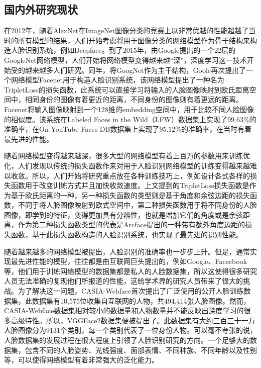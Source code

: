 
\subsection{国内外研究现状}

在2012年，随着AlexNet\cite{alexnet}在ImageNet图像分类的竞赛上以非常优越的性能超越了当时的所有模型的结果，人们开始考虑将用于图像分类的网络模型作为骨干结构来构造人脸识别系统，例如Deepface\cite{deepface}。到了2015年，由Google提出的一个22层的GoogleNet\cite{googlenet}网络模型，人们开始将网络模型变得越来越“深”，深度学习这一技术开始受的越来越多人们研究。同年，将GoogNet作为主干结构，Goole再次提出了一个网络模型Facenet\cite{facenet}用于构造人脸识别系统，该网络模型提出了一种名为TripletLoss的损失函数，此系统可以直接学习将输入的人脸图像映射到欧氏距离空间中，相同身份的图像有着更近的距离，不同身份的图像则有着更远的距离。Facenet将输入图像映射到一个128维的embedding空间中，用于比较不同人脸图像的相似度。该系统在Labeled Faces in the Wild（LFW）数据集上实现了$99.63\%$的准确率，在On YouTube Faces DB数据集上实现了$95.12\%$的准确率，在当时有着最先进的性能。

随着网络模型变得越来越深，很多大型的网络模型有着上百万的参数用来训练优化，人们发现以传统的损失函数作来对用于人脸识别网络模型的训练变得越来越难以收敛。所以，人们开始将研究重点放在各种训练技巧上，例如设计各式各样的损失函数用于改变训练方式并且加快收敛速度。上文提到的TripletLoss损失函数是作为基于欧氏距离的一种，另一种损失函数的类型则是基于角度和余弦边距的损失函数，不同于将人脸图像映射到欧式空间中，第二种损失函数用于将不同身份的人脸图像，即学到的特征，变得更加具有分辨性，也就是增加它们的角度或是余弦距离，作为第二种损失函数类型的代表是Arcface\cite{arcface}提出的一种带有额外角度边距的损失函数，基于此损失函数构造的人脸识别系统，也实现了最先进的识别性能。

随着越来越多的网络模型被提出，人脸识别的准确率也一步步上升。但是，通常实现最先进性能的模型，往往都是由互联网巨头提出的，例如Google、Facecbook等，他们用于训练网络模型的数据集都是私人的人脸数据集，所以这使得很多研究人员无法准确的复现他们所报道的性能，这给学术界的研究人员带来了很大的挑战。为了解决这一问题，CASIA-Webface\cite{webface}首次提出了广泛使用的公开人脸训练数据集，此数据集有10,575位收集自互联网的人物，共494,414张人脸图像。然而，CASIA-Webface数据集相对较小的数据量和人物数量并不能反映出深度学习的很多高级特性。所以，VGGFace2\cite{vggface2}数据集便被提出了。此数据集有大约三百三十一万人脸图像分为9131个类别，每一个类别代表了一位身份人物。可以毫不夸张的说，人脸数据集的发展过程在很大程度上引领了人脸识别研究的方向。一个足够大的数据集，包含不同的人脸姿势、光线强度、面部表情、不同种族、不同年龄以及性别等，可以使得网络模型有着非常强大的泛化能力。

